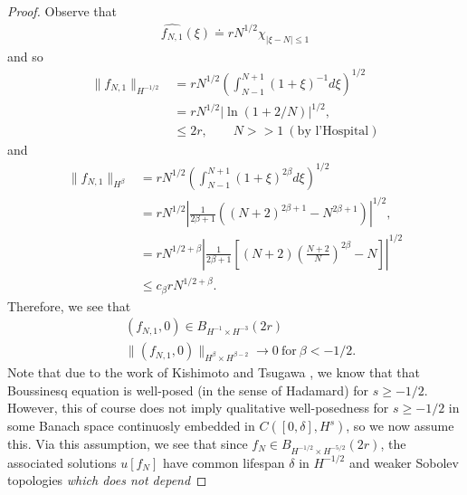 \documentclass[12pt,reqno]{amsart}
\numberwithin{equation}{section}  %
\newcommand{\wh}{\widehat}
\begin{document}
\begin{proof}
%
Observe that
%
%
\begin{equation}
\begin{split}
  \wh{f_{N,1}}(\xi) \doteq r N^{1/2} \chi_{|\xi - N|\le 1}
\end{split}
\end{equation}
%
and so
%
%
%
\begin{equation*}
\begin{split}
  \| f_{N,1} \|_{H^{-1/2}}
  & = rN^{1/2} \left( \int_{N-1}^{N+1} (1 + \xi)^{-1} d \xi
  \right)^{1/2}
  \\
  & = rN^{1/2} \left| \ln (1 + 2/N) \right|^{1/2},
  \\
  & \le 2r, \qquad N >>1 \ (\text{by l'Hospital})
\end{split}
\end{equation*}
%
%
and 
%
\begin{equation*}
\begin{split}
  \| f_{N,1} \|_{H^{\beta}}
  & = rN^{1/2} \left( \int_{N-1}^{N+1} (1 + \xi)^{2\beta} d \xi
  \right)^{1/2}
  \\
  & = rN^{1/2} \left| \frac{1}{2\beta+1}( (N+2)^{2\beta+1} - N^{2\beta+1} ) \right|^{1/2},
  \\
  & = r N^{1/2 + \beta} \left| {\frac{1}{2\beta+1}}\left [ (N+2) \left( \frac{N+2}{N}
  \right)^{2\beta} -N \right ] \right|^{1/2}  \\
  & \le c_{\beta} r N^{1/2 + \beta}.
\end{split}
\end{equation*}
%
Therefore, we see that 
\begin{equation*}
  \begin{split}
    & (f_{N,1}, 0) \in B_{H^{-1} \times H^{-3}}(2r)
    \\
    & \|(f_{N,1}, 0)\|_{H^{\beta} \times H^{\beta -2}} \to 0 \ \text{for} \ \beta < -1/2.
    \end{split}
\end{equation*}
Note that due to the work of Kishimoto and Tsugawa \cite{Kishimoto:2010ly}, we know that that Boussinesq equation is well-posed (in the sense of Hadamard) for $s
\ge -1/2$. However, this of course does not imply qualitative well-posedness for $s \ge -1/2$ in some Banach space continuosly embedded in $C([0, \delta], H^{s})$, so we now assume this. Via this assumption, we see that since $f_{N} \in B_{H^{-1/2} \times H^{-5/2}}(2r)$, the associated
solutions $u[f_{N}]$ have common lifespan $\delta$ in $H^{-1/2}$ and weaker Sobolev topologies \emph{which does not depend
}
\end{proof}
\end{document}
